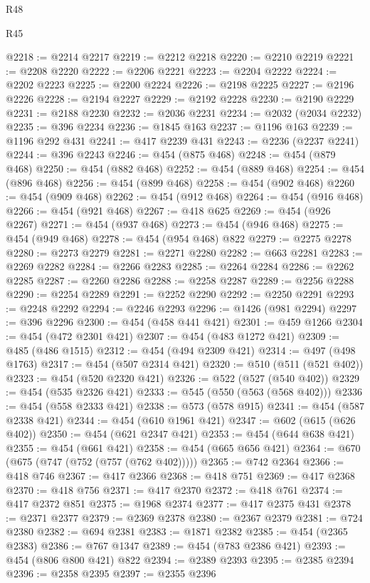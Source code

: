 \begin{lexlean}{R48}
\begin{lexlean}{R45}
\begin{coremodule}
{{{{{{{{{{{{{{{{{{{{{{{{{{{{{{{{{{{{{{{{{{{{{{{{{{{{{{{{{{{{{{{{{{{{{{{{{{{{{{{{{{{{{{{{{{{@2218 := @2214 @2217
@2219 := @2212 @2218
@2220 := @2210 @2219
@2221 := @2208 @2220
@2222 := @2206 @2221
@2223 := @2204 @2222
@2224 := @2202 @2223
@2225 := @2200 @2224
@2226 := @2198 @2225
@2227 := @2196 @2226
@2228 := @2194 @2227
@2229 := @2192 @2228
@2230 := @2190 @2229
@2231 := @2188 @2230
@2232 := @2036 @2231
@2234 := @2032 (@2034 @2232)
@2235 := @396 @2234
@2236 := @1845 @163
@2237 := @1196 @163
@2239 := @1196 @292 @431
@2241 := @417 @2239 @431
@2243 := @2236 (@2237 @2241)
@2244 := @396 @2243
@2246 := @454 (@875 @468)
@2248 := @454 (@879 @468)
@2250 := @454 (@882 @468)
@2252 := @454 (@889 @468)
@2254 := @454 (@896 @468)
@2256 := @454 (@899 @468)
@2258 := @454 (@902 @468)
@2260 := @454 (@909 @468)
@2262 := @454 (@912 @468)
@2264 := @454 (@916 @468)
@2266 := @454 (@921 @468)
@2267 := @418 @625
@2269 := @454 (@926 @2267)
@2271 := @454 (@937 @468)
@2273 := @454 (@946 @468)
@2275 := @454 (@949 @468)
@2278 := @454 (@954 @468) @822
@2279 := @2275 @2278
@2280 := @2273 @2279
@2281 := @2271 @2280
@2282 := @663 @2281
@2283 := @2269 @2282
@2284 := @2266 @2283
@2285 := @2264 @2284
@2286 := @2262 @2285
@2287 := @2260 @2286
@2288 := @2258 @2287
@2289 := @2256 @2288
@2290 := @2254 @2289
@2291 := @2252 @2290
@2292 := @2250 @2291
@2293 := @2248 @2292
@2294 := @2246 @2293
@2296 := @1426 (@981 @2294)
@2297 := @396 @2296
@2300 := @454 (@458 @441 @421)
@2301 := @459 @1266
@2304 := @454 (@472 @2301 @421)
@2307 := @454 (@483 @1272 @421)
@2309 := @485 (@486 @1515)
@2312 := @454 (@494 @2309 @421)
@2314 := @497 (@498 @1763)
@2317 := @454 (@507 @2314 @421)
@2320 := @510 (@511 (@521 @402))
@2323 := @454 (@520 @2320 @421)
@2326 := @522 (@527 (@540 @402))
@2329 := @454 (@535 @2326 @421)
@2333 := @545 (@550 (@563 (@568 @402)))
@2336 := @454 (@558 @2333 @421)
@2338 := @573 (@578 @915)
@2341 := @454 (@587 @2338 @421)
@2344 := @454 (@610 @1961 @421)
@2347 := @602 (@615 (@626 @402))
@2350 := @454 (@621 @2347 @421)
@2353 := @454 (@644 @638 @421)
@2355 := @454 (@661 @421)
@2358 := @454 (@665 @656 @421)
@2364 := @670 (@675 (@747 (@752 (@757 (@762 @402)))))
@2365 := @742 @2364
@2366 := @418 @746
@2367 := @417 @2366
@2368 := @418 @751
@2369 := @417 @2368
@2370 := @418 @756
@2371 := @417 @2370
@2372 := @418 @761
@2374 := @417 @2372 @851
@2375 := @1968 @2374
@2377 := @417 @2375 @431
@2378 := @2371 @2377
@2379 := @2369 @2378
@2380 := @2367 @2379
@2381 := @724 @2380
@2382 := @694 @2381
@2383 := @1871 @2382
@2385 := @454 (@2365 @2383)
@2386 := @767 @1347
@2389 := @454 (@783 @2386 @421)
@2393 := @454 (@806 @800 @421) @822
@2394 := @2389 @2393
@2395 := @2385 @2394
@2396 := @2358 @2395
@2397 := @2355 @2396
}}}}}}}}}}}}}}}}}}}}}}}}}}}}}}}}}}}}}}}}}}}}}}}}}}}}}}}}}}}}}}}}}}}}}}}}}}}}}}}}}}}}}}}}}}}
\end{coremodule}
\end{lexlean}
\end{lexlean}
